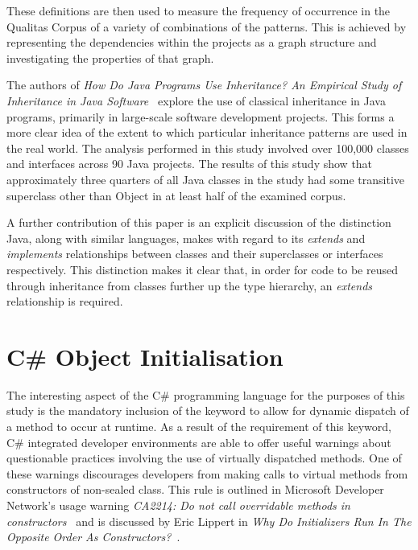 These definitions are then used to measure the frequency of occurrence in the Qualitas Corpus of a variety of combinations of the patterns. This is achieved by representing the dependencies within the projects as a graph structure and investigating the properties of that graph.
\newline

The authors of \textit{How Do Java Programs Use Inheritance? An Empirical Study of Inheritance in Java Software~\cite{HowProgramsUseInheritance}} explore the use of classical inheritance in Java programs, primarily in large-scale software development projects. This forms a more clear idea of the extent to which particular inheritance patterns are used in the real world. The analysis performed in this study involved over 100,000 classes and interfaces across 90 Java projects. The results of this study show that approximately three quarters of all Java classes in the study had some transitive superclass other than Object in at least half of the examined corpus.
\newline

A further contribution of this paper is an explicit discussion of the distinction Java, along with similar languages, makes with regard to its \textit{extends} and \textit{implements} relationships between classes and their superclasses or interfaces respectively. This distinction makes it clear that, in order for code to be reused through inheritance from classes further up the type hierarchy, an \textit{extends} relationship is required.

\section{C\# Object Initialisation}
The interesting aspect of the C\# programming language for the purposes of this study is the mandatory inclusion of the  keyword to allow for dynamic dispatch of a method to occur at runtime. As a result of the requirement of this keyword, C\# integrated developer environments are able to offer useful warnings about questionable practices involving the use of virtually dispatched methods. One of these warnings discourages developers from making calls to virtual methods from constructors of non-sealed class. This rule is outlined in Microsoft Developer Network's usage warning \textit{CA2214: Do not call overridable methods in constructors~\cite{OverridableMethodWarning}} and is discussed by Eric Lippert in \textit{Why Do Initializers Run In The Opposite Order As Constructors?~\cite{NoDowncalls}}.
\newline

